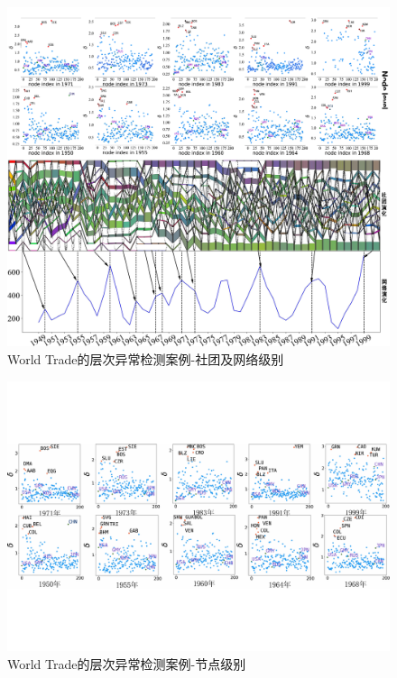 \begin{figure}[!htbp]
	\centering
	\includegraphics[width=\textwidth]{figures/chap05/worldtrade-CNlevel.pdf}
	\caption{World Trade的层次异常检测案例-社团及网络级别}
	\label{fig:worldtradecaseCN}
\end{figure}

\begin{figure}[!htbp]
	\centering
	\includegraphics[width=\textwidth]{figures/chap05/worldtrade-Nlevel-new.pdf}
	\caption{World Trade的层次异常检测案例-节点级别}
	\label{fig:worldtradecaseN}
\end{figure}


